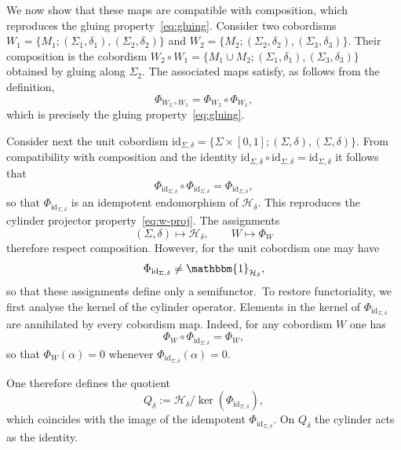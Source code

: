 \documentclass[11pt]{article}
\theoremstyle{definition}
\numberwithin{equation}{section}
\begin{document}
We now show that these maps are compatible with composition, which reproduces the gluing property~\eqref{eq:gluing}. 
Consider two cobordisms $W_1=\{M_1;(\Sigma_1,\delta_1),(\Sigma_2,\delta_2)\}$ and $W_2=\{M_2;(\Sigma_2,\delta_2),(\Sigma_3,\delta_3)\}$. Their composition is the cobordism $W_2\circ W_1=\{M_1\cup M_2;(\Sigma_1,\delta_1),(\Sigma_3,\delta_3)\}$ obtained by gluing along $\Sigma_2$. 
The associated maps satisfy, as follows from the definition,
\begin{equation}
\Phi_{W_2\circ W_1}=\Phi_{W_2}\circ \Phi_{W_1},
\end{equation}
which is precisely the gluing property~\eqref{eq:gluing}.

Consider next the unit cobordism $\mathrm{id}_{\Sigma,\delta}=\{\Sigma\times[0,1];(\Sigma,\delta),(\Sigma,\delta)\}$. From compatibility with composition and the identity 
$\mathrm{id}_{\Sigma,\delta}\circ \mathrm{id}_{\Sigma,\delta}=\mathrm{id}_{\Sigma,\delta}$ 
it follows that
\begin{equation}
\Phi_{\mathrm{id}_{\Sigma,\delta}}\circ \Phi_{\mathrm{id}_{\Sigma,\delta}}
=\Phi_{\mathrm{id}_{\Sigma,\delta}},
\end{equation}
so that $\Phi_{\mathrm{id}_{\Sigma,\delta}}$ is an idempotent endomorphism of $\mathcal H_{\delta}$. This reproduces the cylinder projector property~\eqref{eq:w-proj}. The assignments
\begin{equation}
(\Sigma,\delta)\mapsto\mathcal H_{\delta},
\qquad
W\mapsto\Phi_W
\end{equation}
therefore respect composition. 
However, for the unit cobordism one may have
\begin{equation}
\Phi_{\mathrm{id}_{\Sigma,\delta}}\neq \mathbbm{1}_{\mathcal H_{\delta}},
\end{equation}
so that these assignments define only a semifunctor.~To restore functoriality, we first analyse the kernel of the cylinder operator. Elements in the kernel of $\Phi_{\mathrm{id}_{\Sigma,\delta}}$ are annihilated by every cobordism map. Indeed, for any cobordism $W$ one has
\begin{equation}
\Phi_W\circ \Phi_{\mathrm{id}_{\Sigma,\delta}}=\Phi_W,
\end{equation}
so that $\Phi_W(\alpha)=0$ whenever $\Phi_{\mathrm{id}_{\Sigma,\delta}}(\alpha)=0$.

One therefore defines the quotient
\begin{equation}
Q_{\delta}:=\mathcal H_{\delta}/\ker(\Phi_{\mathrm{id}_{\Sigma,\delta}}),
\end{equation}
which coincides with the image of the idempotent $\Phi_{\mathrm{id}_{\Sigma,\delta}}$. 
On $Q_{\delta}$ the cylinder acts as the identity.
\end{document}
